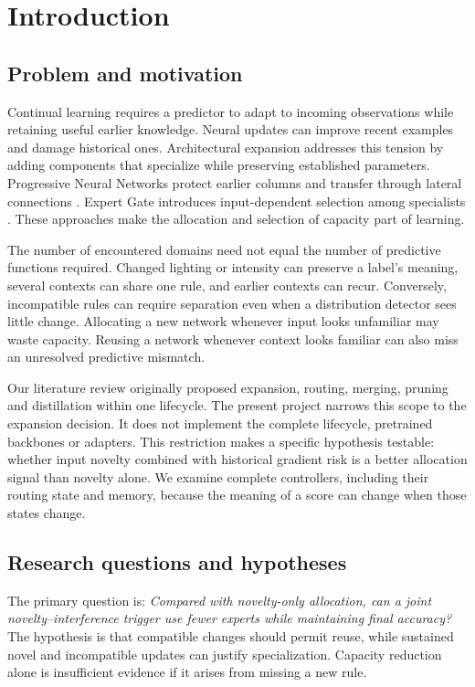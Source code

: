 \section{Introduction}
\subsection{Problem and motivation}
Continual learning requires a predictor to adapt to incoming observations while retaining useful earlier knowledge. Neural updates can improve recent examples and damage historical ones. Architectural expansion addresses this tension by adding components that specialize while preserving established parameters. Progressive Neural Networks protect earlier columns and transfer through lateral connections \cite{pnn}. Expert Gate introduces input-dependent selection among specialists \cite{expertgate}. These approaches make the allocation and selection of capacity part of learning.

The number of encountered domains need not equal the number of predictive functions required. Changed lighting or intensity can preserve a label's meaning, several contexts can share one rule, and earlier contexts can recur. Conversely, incompatible rules can require separation even when a distribution detector sees little change. Allocating a new network whenever input looks unfamiliar may waste capacity. Reusing a network whenever context looks familiar can also miss an unresolved predictive mismatch.

Our literature review originally proposed expansion, routing, merging, pruning and distillation within one lifecycle. The present project narrows this scope to the expansion decision. It does not implement the complete lifecycle, pretrained backbones or adapters. This restriction makes a specific hypothesis testable: whether input novelty combined with historical gradient risk is a better allocation signal than novelty alone. We examine complete controllers, including their routing state and memory, because the meaning of a score can change when those states change.

\subsection{Research questions and hypotheses}
The primary question is: \emph{Compared with novelty-only allocation, can a joint novelty--interference trigger use fewer experts while maintaining final accuracy?} The hypothesis is that compatible changes should permit reuse, while sustained novel and incompatible updates can justify specialization. Capacity reduction alone is insufficient evidence if it arises from missing a new rule.

